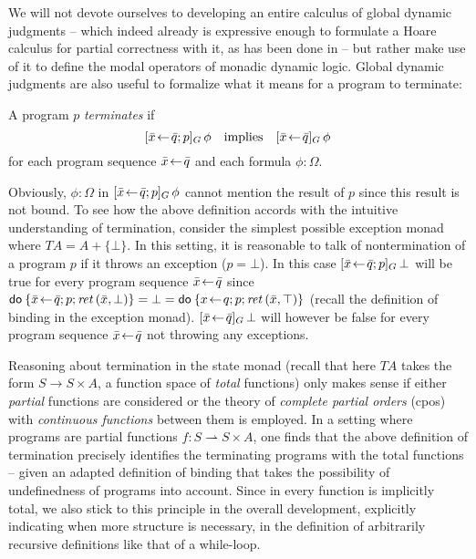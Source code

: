 We will not devote ourselves to developing an entire calculus of global dynamic
judgments -- which indeed already is expressive enough to formulate a Hoare
calculus for partial correctness with it, as has been done in
\cite{SchroederMossakowski:Hoare} -- but rather make use of it to define the
modal operators of monadic dynamic logic. Global dynamic judgments are also
useful to formalize what it means for a program to terminate:
\begin{defn}
  \label{defn:termination}
  A program $p$ \emph{terminates} if
  \[ [\bar x \!\gets\! \bar q; p]_G\,\phi \quad \text{implies} \quad [\bar x\!\gets\!
    \bar q]_G\,\phi\]
  for each program sequence $\bar x\!\gets\! \bar q$ and each formula $\phi : \Omega$.
\end{defn}
\begin{expl}
  \label{ex:term-except}
  Obviously, $\phi :\Omega$ in $[\bar x\!\gets\! \bar q; p]_G\,\phi$ cannot mention the result
  of $p$ since this result is not bound. To see how the above definition accords
  with the intuitive understanding of termination, consider the simplest
  possible exception monad where $T A = A + \{\bot\}$. In this setting, it is
  reasonable to talk of nontermination of a program $p$ if it throws an
  exception (\IE $p = \bot$). In this case $[\bar x\!\gets\! \bar q; p]_G\,\bot$ will be
  true for every program sequence $\bar x \!\gets\! \bar q$ since $\mathsf{do}\: \{\bar
    x\!\gets\! \bar q; p; \mathit{ret\,} (\bar x, \bot)\} = \bot = \mathsf{do}\: \{x\!\gets\! q;p; \mathit{ret\,} (\bar x,
      \top)\}$ (recall the definition of binding in the exception monad). $[\bar
        x\!\gets\! \bar q]_G\,\bot$ will however be false for every  program
      sequence $\bar x\!\gets\! \bar q$ not throwing any exceptions.
\end{expl}
\begin{rem}
  Reasoning about termination in the state monad (recall that here $T A$ takes
  the form $S \to S \times A$, \IE a function space of \emph{total} functions) only
  makes sense if either \emph{partial} functions are considered or the theory of
  \emph{complete partial orders} (cpos) with \emph{continuous functions} between
  them is employed. In a setting where programs are partial functions $f : S \rightharpoonup S
  \times A$, one finds that the above definition of termination precisely identifies
  the terminating programs with the total functions -- given an adapted
  definition of binding that takes the possibility of undefinedness of programs
  into account. Since in \IsabelleHOL every function is implicitly total, we
  also stick to this principle in the overall development, explicitly indicating
  when more structure is necessary, \EG in the definition of arbitrarily
  recursive definitions like that of a while-loop.
\end{rem}


